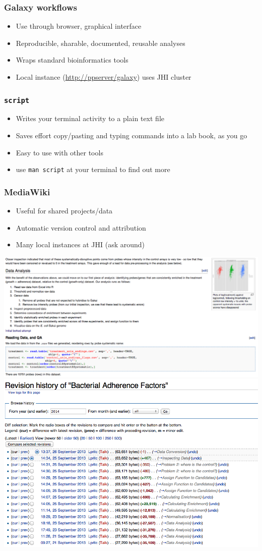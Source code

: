 \documentclass[table]{beamer}
\begin{document}
   \begin{frame}
     \frametitle{Galaxy workflows}
     \begin{itemize}
       \item Use through browser, graphical interface
       \item Reproducible, sharable, documented, reusable analyses
       \item Wraps standard bioinformatics tools
       \item Local instance (\url{http://ppserver/galaxy}) uses JHI cluster       
     \end{itemize}
   \end{frame}      
   
   \begin{frame}
     \frametitle{\texttt{script}}
     \begin{itemize}
       \item Writes your terminal activity to a plain text file
       \item Saves effort copy/pasting and typing commands into a lab book, as you go
       \item Easy to use with other tools 
       \item use \texttt{man script} at your terminal to find out more
     \end{itemize}
   \end{frame}   
   
   \begin{frame}
     \frametitle{MediaWiki}
     \begin{itemize}
       \item Useful for shared projects/data
       \item Automatic version control and attribution
       \item Many local instances at JHI (ask around)
     \end{itemize}
    \includegraphics[width=.4\textwidth]{images/mediawiki_after}
	\includegraphics[width=.4\textwidth]{images/mediawiki_version_control}     
   \end{frame}
   
\end{document}
